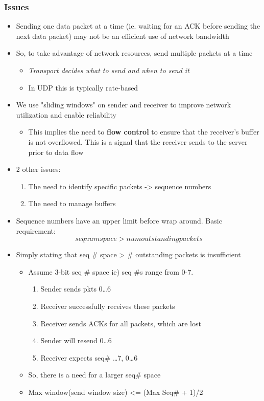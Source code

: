 \documentclass[11pt]{article}
\begin{document}
\subsubsection{Issues}
\label{sec:orgheadline126}
\begin{itemize}
\item Sending one data packet at a time (ie. waiting for an ACK before
sending the next data packet) may not be an efficient use of network
bandwidth
\item So, to take advantage of network resources, send multiple packets at
a time
\begin{itemize}
\item \emph{Transport decides what to send and when to send it}
\item In UDP this is typically rate-based
\end{itemize}
\item We use "sliding windows" on sender and receiver to improve network
utilization and enable reliability
\begin{itemize}
\item This implies the need to \textbf{flow control} to ensure that the
receiver's buffer is not overflowed. This is a signal that the
receiver sends to the server prior to data flow
\end{itemize}
\item 2 other issues:
\begin{enumerate}
\item The need to identify specific packets -> sequence numbers
\item The need to manage buffers
\end{enumerate}
\item Sequence numbers have an upper limit before wrap around. Basic
requirement:
\[seq num space > num outstanding packets\]
\item Simply stating that seq \# space > \# outstanding packets is
insufficient
\begin{itemize}
\item Assume 3-bit seq \# space ie) seq \#s range from 0-7. 
\begin{enumerate}
\item Sender sends pkts 0\ldots{}6
\item Receiver successfully receives these packets
\item Receiver sends ACKs for all packets, which are lost
\item Sender will resend 0\ldots{}6
\item Receiver expects seq\# \ldots{}7, 0\ldots{}6
\end{enumerate}
\item So, there is a need for a larger seq\# space
\item Max window(send window size) <= (Max Seq\# + 1)/2
\end{itemize}
\end{itemize}
\end{document}
